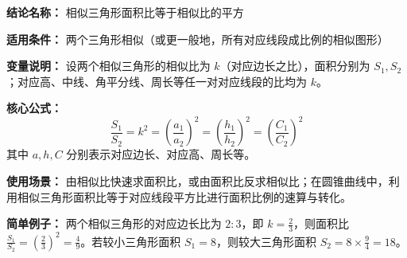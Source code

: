 \textbf{结论名称：} 相似三角形面积比等于相似比的平方

\textbf{适用条件：} 两个三角形相似（或更一般地，所有对应线段成比例的相似图形）

\textbf{变量说明：} 设两个相似三角形的相似比为 \(k\)（对应边长之比），面积分别为 \(S_1, S_2\)；对应高、中线、角平分线、周长等任一对对应线段的比均为 \(k\)。

\textbf{核心公式：} 
\[
\boxed{\frac{S_1}{S_2} = k^2 = \left(\frac{a_1}{a_2}\right)^2 = \left(\frac{h_1}{h_2}\right)^2 = \left(\frac{C_1}{C_2}\right)^2}
\]
其中 \(a, h, C\) 分别表示对应边长、对应高、周长等。

\textbf{使用场景：} 由相似比快速求面积比，或由面积比反求相似比；在圆锥曲线中，利用相似三角形面积比等于对应线段平方比进行面积比例的速算与转化。

\textbf{简单例子：} 两个相似三角形的对应边长比为 \(2:3\)，即 \(k=\frac{2}{3}\)，则面积比 \(\frac{S_1}{S_2} = \left(\frac{2}{3}\right)^2 = \frac{4}{9}\)。若较小三角形面积 \(S_1 = 8\)，则较大三角形面积 \(S_2 = 8 \times \frac{9}{4} = 18\)。